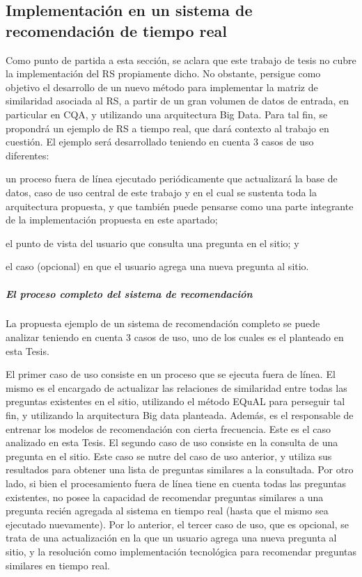 \subsection{Implementación en un sistema de recomendación de tiempo real}

Como punto de partida a esta sección, se aclara que este trabajo de tesis no cubre la implementación del RS propiamente dicho. No obstante, persigue como objetivo el desarrollo de un nuevo método para implementar la matriz de similaridad asociada al RS, a partir de un gran volumen de datos de entrada, en particular en CQA, y utilizando una arquitectura Big Data. Para tal fin, se propondrá un ejemplo de RS a tiempo real, que dará contexto al trabajo en cuestión. El ejemplo será desarrollado teniendo en cuenta 3 casos de uso diferentes: \begin{enumerate*} [label=(\roman*)] \item un proceso fuera de línea ejecutado periódicamente que actualizará la base de datos, caso de uso central de este trabajo y en el cual se sustenta toda la arquitectura propuesta, y que también puede pensarse como una parte integrante de la implementación propuesta en este apartado; \item el punto de vista del usuario que consulta una pregunta en el sitio; y \item el caso  (opcional) en que el usuario agrega una nueva pregunta al sitio.\end{enumerate*}

\subparagraph{El proceso completo del sistema de recomendación}
La propuesta ejemplo de un sistema de recomendación completo se puede analizar teniendo en cuenta 3 casos de uso, uno de los cuales es el planteado en esta Tesis.

\bigskip El primer caso de uso consiste en un proceso que se ejecuta fuera de línea. El mismo es el encargado de actualizar las relaciones de similaridad entre todas las preguntas existentes en el sitio, utilizando el método EQuAL para perseguir tal fin, y utilizando la arquitectura Big data planteada. Además, es el responsable de entrenar los modelos de recomendación con cierta frecuencia. Este es el caso analizado en esta Tesis. El segundo caso de uso consiste en la consulta de una pregunta en el sitio. Este caso se nutre del caso de uso anterior, y utiliza sus resultados para obtener una lista de preguntas similares a la consultada. Por otro lado, si bien el procesamiento fuera de línea tiene en cuenta todas las preguntas existentes, no posee la capacidad de recomendar preguntas similares a una pregunta recién agregada al sistema en tiempo real (hasta que el mismo sea ejecutado nuevamente). Por lo anterior, el tercer caso de uso, que es opcional, se trata de una actualización en la que un usuario agrega una nueva pregunta al sitio, y la resolución como implementación tecnológica para recomendar preguntas similares en tiempo real.

